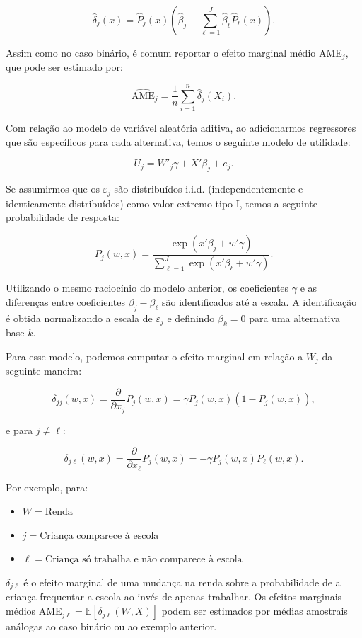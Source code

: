 \documentclass[12pt, a4paper, openany]{book}
\numberwithin{equation}{chapter}
\numberwithin{table}{chapter}
\numberwithin{figure}{chapter}
\theoremstyle{break}
\begin{document}
\[
\hat{\delta}_j(x) = \hat{P}_j(x) \left( \hat{{\beta}}_j - \sum_{\ell=1}^{J} \hat{{\beta}}_\ell \hat{P}_\ell(x) \right).
\]

Assim como no caso binário, é comum reportar o efeito marginal médio AME$_j$, que pode ser estimado por:

\[
\widehat{\text{AME}}_j = \frac{1}{n} \sum_{i=1}^{n} \hat{\delta}_j(X_i).
\]

Com relação ao modelo de variável aleatória aditiva, ao adicionarmos regressores que são específicos para cada alternativa, temos o seguinte modelo de utilidade:

\[
U_j = {W}'_j{\gamma} + {X}' {\beta}_j + e_j.
\]

Se assumirmos que os \( \varepsilon_j \) são distribuídos i.i.d. (independentemente e identicamente distribuídos) como valor extremo tipo I, temos a seguinte probabilidade de resposta:

\[
P_j(w, x) = \frac{\exp\left( {x}' {\beta}_j + {w}' {\gamma} \right)}{\sum_{\ell=1}^{J} \exp\left( {x}' {\beta}_\ell + {w}' {\gamma} \right)}.
\]

Utilizando o mesmo raciocínio do modelo anterior, os coeficientes \( {\gamma} \) e as diferenças entre coeficientes \( {\beta}_j - {\beta}_\ell \) são identificados até a escala. A identificação é obtida normalizando a escala de \( \varepsilon_j \) e definindo \( {\beta}_k = 0 \) para uma alternativa base \( k \).

Para esse modelo, podemos computar o efeito marginal em relação a \( W_j \) da seguinte maneira:

\[
\delta_{jj}(w, x) = \frac{\partial}{\partial x_j} P_j(w, x) = {\gamma} P_j(w, x) \left(1 - P_j(w, x)\right),
\]

e para \( j \neq \ell \):

\[
\delta_{j\ell}(w, x) = \frac{\partial}{\partial x_\ell} P_j(w, x) = -{\gamma} P_j(w, x) P_\ell(w, x).
\]

Por exemplo, para:
\begin{itemize}
    \item  $W = \text{Renda}$ 
    \item  $j  = \text{Criança comparece à escola}$ 
    \item  $\ell = \text{Criança só trabalha e não comparece à escola}$
\end{itemize}

\( \delta_{j\ell} \) é o efeito marginal de uma mudança na renda sobre a probabilidade de a criança frequentar a escola ao invés de apenas trabalhar. Os efeitos marginais médios AME$_{j\ell} = \mathbb{E}\left[\delta_{j\ell}(W, X)\right]$ podem ser estimados por médias amostrais análogas ao caso binário ou ao exemplo anterior.
\end{document}
